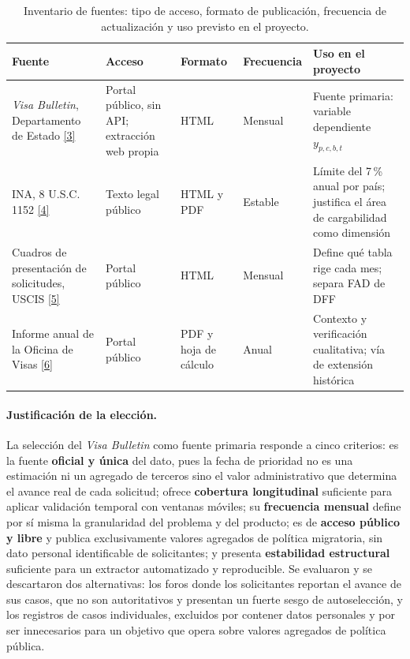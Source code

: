 \documentclass[12pt,letterpaper]{report}
\newcommand{\cita}[1]{\hyperref[bib:#1]{[#1]}}
\begin{document}
\begin{table}[H]
\centering
\footnotesize
\caption[Inventario de fuentes de datos]{Inventario de fuentes: tipo de acceso, formato de
publicación, frecuencia de actualización y uso previsto en el proyecto.}
\label{tab:inventario}
\begin{tabular}{p{2.9cm}p{2.4cm}p{1.7cm}p{1.75cm}p{4.25cm}}
\toprule
\rowcolor{uacjblue!15}
\textbf{Fuente} & \textbf{Acceso} & \textbf{Formato} & \textbf{Frecuencia} & \textbf{Uso en el proyecto} \\ \midrule
\textit{Visa Bulletin}, Departamento de Estado \cita{3} & Portal público, sin API; extracción web propia & HTML & Mensual & Fuente primaria: variable dependiente $y_{p,c,b,t}$ \\
INA, 8 U.S.C. 1152 \cita{4} & Texto legal público & HTML y PDF & Estable & Límite del 7\,\% anual por país; justifica el área de cargabilidad como dimensión \\
Cuadros de presentación de solicitudes, USCIS \cita{5} & Portal público & HTML & Mensual & Define qué tabla rige cada mes; separa FAD de DFF \\
Informe anual de la Oficina de Visas \cita{6} & Portal público & PDF y hoja de cálculo & Anual & Contexto y verificación cualitativa; vía de extensión histórica \\
\bottomrule
\end{tabular}
\end{table}

\paragraph{Justificación de la elección.} La selección del \textit{Visa Bulletin} como
fuente primaria responde a cinco criterios: es la fuente \textbf{oficial y única} del dato,
pues la fecha de prioridad no es una estimación ni un agregado de terceros sino el valor
administrativo que determina el avance real de cada solicitud; ofrece \textbf{cobertura
longitudinal} suficiente para aplicar validación temporal con ventanas móviles; su
\textbf{frecuencia mensual} define por sí misma la granularidad del problema y del
producto; es de \textbf{acceso público y libre} y publica exclusivamente valores agregados
de política migratoria, sin dato personal identificable de solicitantes; y presenta
\textbf{estabilidad estructural} suficiente para un extractor automatizado y reproducible.
Se evaluaron y se descartaron dos alternativas: los foros donde los solicitantes reportan
el avance de sus casos, que no son autoritativos y presentan un fuerte sesgo de
autoselección, y los registros de casos individuales, excluidos por contener datos
personales y por ser innecesarios para un objetivo que opera sobre valores agregados de
política pública.
\end{document}
